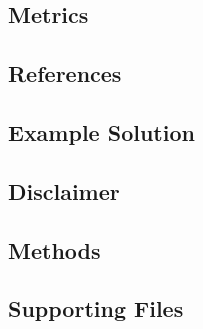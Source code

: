 
\subsection{Metrics}

\subsection{References}

\subsection{Example Solution}

\subsection{Disclaimer}

\subsection{Methods}

\subsection{Supporting Files}


